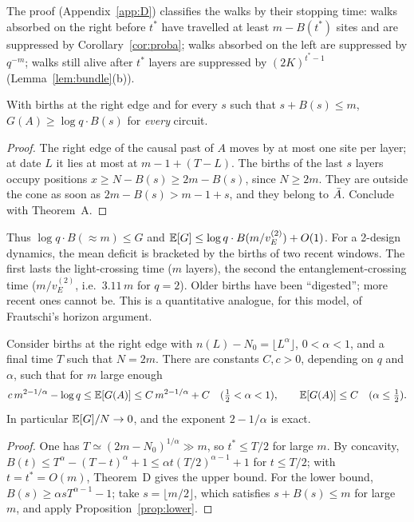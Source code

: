 The proof (Appendix~\ref{app:D}) classifies the walks by their stopping time: walks absorbed on the right before $t^\ast$ have travelled at least $m-B(t^\ast)$ sites and are suppressed by Corollary~\ref{cor:proba}; walks absorbed on the left are suppressed by $q^{-m}$; walks still alive after $t^\ast$ layers are suppressed by $(2K)^{t^\ast-1}$ (Lemma~\ref{lem:bundle}(b)).

\begin{proposition}\label{prop:lower}
With births at the right edge and for every $s$ such that $s+B(s)\le m$, $G(A)\ge\log q\cdot B(s)$ for \emph{every} circuit.
\end{proposition}
\begin{proof}
The right edge of the causal past of $A$ moves by at most one site per layer; at date $L$ it lies at most at $m-1+(T-L)$. The births of the last $s$ layers occupy positions $x\ge N-B(s)\ge 2m-B(s)$, since $N\ge 2m$. They are outside the cone as soon as $2m-B(s)>m-1+s$, and they belong to $\bar A$. Conclude with Theorem~A.
\end{proof}

Thus $\log q\cdot B(\approx m)\le G$ and $\mathbb{E}[G]\le\log q\cdot B(m/v_E^{(2)})+O(1)$. For a 2-design dynamics, the mean deficit is bracketed by the births of two recent windows. The first lasts the light-crossing time ($m$ layers), the second the entanglement-crossing time ($m/v_E^{(2)}$, i.e.\ $3.11\,m$ for $q=2$). Older births have been ``digested''; more recent ones cannot be. This is a quantitative analogue, for this model, of Frautschi's horizon argument.

\begin{corollary}\label{cor:alpha}
Consider births at the right edge with $n(L)-N_0=\lfloor L^\alpha\rfloor$, $0<\alpha<1$, and a final time $T$ such that $N=2m$. There are constants $C,c>0$, depending on $q$ and $\alpha$, such that for $m$ large enough
\begin{equation}
c\,m^{2-1/\alpha}-\log q\le\mathbb{E}[G(A)]\le C\,m^{2-1/\alpha}+C\quad(\tfrac12<\alpha<1),\qquad
\mathbb{E}[G(A)]\le C\quad(\alpha\le\tfrac12).
\end{equation}
In particular $\mathbb{E}[G]/N\to0$, and the exponent $2-1/\alpha$ is exact.
\end{corollary}
\begin{proof}
One has $T\simeq(2m-N_0)^{1/\alpha}\gg m$, so $t^\ast\le T/2$ for large $m$. By concavity, $B(t)\le T^\alpha-(T-t)^\alpha+1\le\alpha t(T/2)^{\alpha-1}+1$ for $t\le T/2$; with $t=t^\ast=O(m)$, Theorem~D gives the upper bound. For the lower bound, $B(s)\ge\alpha sT^{\alpha-1}-1$; take $s=\lfloor m/2\rfloor$, which satisfies $s+B(s)\le m$ for large $m$, and apply Proposition~\ref{prop:lower}.
\end{proof}

